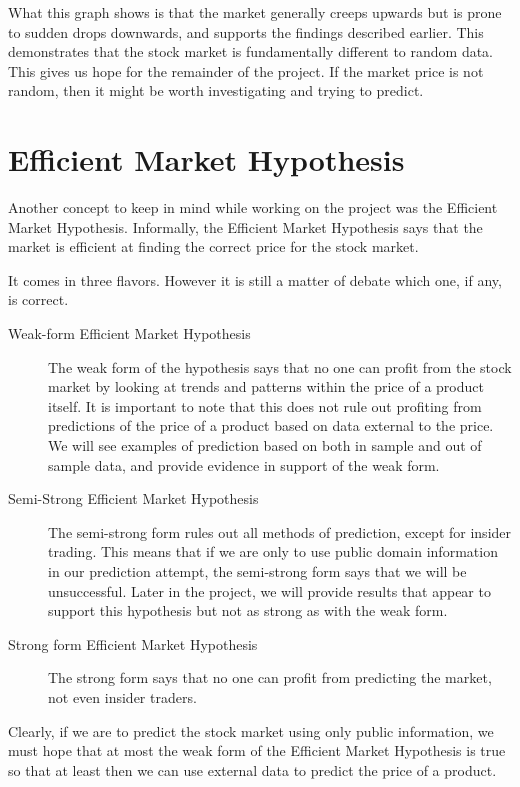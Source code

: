 \documentclass{report}
\begin{document}
What this graph shows is that the market generally creeps upwards but is prone to sudden drops downwards, and supports the findings described earlier. This demonstrates that the stock market is fundamentally different to random data. This gives us hope for the remainder of the project. If the market price is not random, then it might be worth investigating and trying to predict.

\section{Efficient Market Hypothesis}

Another concept to keep in mind while working on the project was the Efficient Market Hypothesis. Informally, the Efficient Market Hypothesis says that the market is efficient at finding the correct price for the stock market.

It comes in three flavors. However it is still a matter of debate which one, if any, is correct.

\begin{description}
  \item[Weak-form Efficient Market Hypothesis] 
  The weak form of the hypothesis says that no one can profit from the stock market by looking at trends and patterns within the price of a product itself. It is important to note that this does not rule out profiting from predictions of the price of a product based on data external to the price. We will see examples of prediction based on both in sample and out of sample data, and provide evidence in support of the weak form.
  
  \item[Semi-Strong Efficient Market Hypothesis]
  The semi-strong form rules out all methods of prediction, except for insider trading. This means that if we are only to use public domain information in our prediction attempt, the semi-strong form says that we will be unsuccessful. Later in the project, we will provide results that appear to support this hypothesis but not as strong as with the weak form.
  
  \item[Strong form Efficient Market Hypothesis]
  The strong form says that no one can profit from predicting the market, not even insider traders.
\end{description}


Clearly, if we are to predict the stock market using only public information, we must hope that at most the weak form of the Efficient Market Hypothesis is true so that at least then we can use external data to predict the price of a product.
\end{document}
